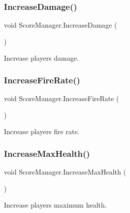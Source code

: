 \subsubsection{\texorpdfstring{IncreaseDamage()}{IncreaseDamage()}}
{\footnotesize\ttfamily void Score\+Manager.\+Increase\+Damage (\begin{DoxyParamCaption}{ }\end{DoxyParamCaption})}



Increase player\textquotesingle{}s damage. 

\mbox{\label{class_score_manager_a0d2287104231446664cb40d541b120d0}} 
\subsubsection{\texorpdfstring{IncreaseFireRate()}{IncreaseFireRate()}}
{\footnotesize\ttfamily void Score\+Manager.\+Increase\+Fire\+Rate (\begin{DoxyParamCaption}{ }\end{DoxyParamCaption})}



Increase player\textquotesingle{}s fire rate. 

\mbox{\label{class_score_manager_ab2cb9d4f0f139ecb67b9c62cdb201554}} 
\subsubsection{\texorpdfstring{IncreaseMaxHealth()}{IncreaseMaxHealth()}}
{\footnotesize\ttfamily void Score\+Manager.\+Increase\+Max\+Health (\begin{DoxyParamCaption}{ }\end{DoxyParamCaption})}



Increase player\textquotesingle{}s maximum health. 

\mbox{\label{class_score_manager_a8a366d34d7bdd899089e918f541b5de5}} 
